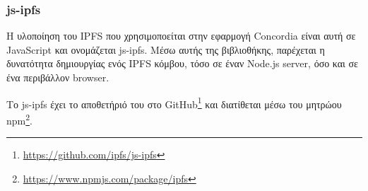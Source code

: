 \subsubsection{js-ipfs} \label{subsection:4-2-4-1-js-ipfs}


H υλοποίηση του IPFS που χρησιμοποείται στην εφαρμογή Concordia είναι αυτή σε JavaScript και ονομάζεται js-ipfs. Μέσω αυτής της βιβλιοθήκης, παρέχεται η δυνατότητα δημιουργίας ενός IPFS κόμβου, τόσο σε έναν Node.js server, όσο και σε ένα περιβάλλον browser.

Το js-ipfs έχει το αποθετήριό του στο GitHub\footnote{\url{https://github.com/ipfs/js-ipfs}} και διατίθεται μέσω του μητρώου npm\footnote{\url{https://www.npmjs.com/package/ipfs}}.
